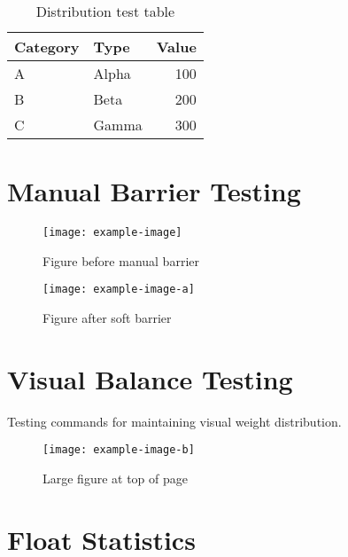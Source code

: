 \documentclass[11pt]{article}
\begin{document}
\lipsum[10-11]

\begin{table}[tbp]
  \caption{Distribution test table}
  \centering
  \begin{tabular}{@{}llr@{}}
    \toprule
    Category & Type & Value \\
    \midrule
    A & Alpha & 100 \\
    B & Beta & 200 \\
    C & Gamma & 300 \\
    \bottomrule
  \end{tabular}
\end{table}

\lipsum[12]

\section{Manual Barrier Testing}

\lipsum[13]

\begin{figure}[tbp]
  \centering
  \texttt{[image: example-image]}
  \caption{Figure before manual barrier}
\end{figure}

\softfloatbarrier %

\lipsum[14]

\begin{figure}[tbp]
  \centering
  \texttt{[image: example-image-a]}
  \caption{Figure after soft barrier}
\end{figure}

\lipsum[15]

\sectionendfloatbarrier %

\section{Visual Balance Testing}

Testing commands for maintaining visual weight distribution.

\begin{figure}[t] %
  \centering
  \texttt{[image: example-image-b]}
  \caption{Large figure at top of page}
\end{figure}

\compensatetopfloat %

\lipsum[16-17]

\balancefloatpage %

\lipsum[18]

\section{Float Statistics}


\lipsum[19-20]
\end{document}
